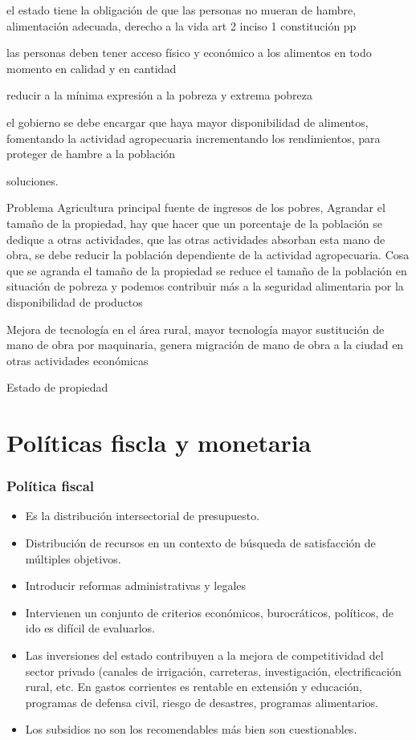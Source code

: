 \documentclass[
  letterpaper,
  DIV=11,
  numbers=noendperiod]{scrartcl}
\providecommand{\tightlist}{%
  \setlength{\itemsep}{0pt}\setlength{\parskip}{0pt}}\usepackage{longtable,booktabs,array}
\begin{document}
el estado tiene la obligación de que las personas no mueran de hambre,
alimentación adecuada, derecho a la vida art 2 inciso 1 constitución pp

las personas deben tener acceso físico y económico a los alimentos en
todo momento en calidad y en cantidad

reducir a la mínima expresión a la pobreza y extrema pobreza

el gobierno se debe encargar que haya mayor disponibilidad de alimentos,
fomentando la actividad agropecuaria incrementando los rendimientos,
para proteger de hambre a la población

soluciones.

Problema Agricultura principal fuente de ingresos de los pobres,
Agrandar el tamaño de la propiedad, hay que hacer que un porcentaje de
la población se dedique a otras actividades, que las otras actividades
absorban esta mano de obra, se debe reducir la población dependiente de
la actividad agropecuaria. Cosa que se agranda el tamaño de la propiedad
se reduce el tamaño de la población en situación de pobreza y podemos
contribuir más a la seguridad alimentaria por la disponibilidad de
productos

Mejora de tecnología en el área rural, mayor tecnología mayor
sustitución de mano de obra por maquinaria, genera migración de mano de
obra a la ciudad en otras actividades económicas

Estado de propiedad

\hypertarget{poluxedticas-fiscla-y-monetaria}{%
\section{Políticas fiscla y
monetaria}\label{poluxedticas-fiscla-y-monetaria}}

\hypertarget{poluxedtica-fiscal}{%
\subsubsection{Política fiscal}\label{poluxedtica-fiscal}}

\begin{itemize}
\tightlist
\item
  Es la distribución intersectorial de presupuesto.
\item
  Distribución de recursos en un contexto de búsqueda de satisfacción de
  múltiples objetivos.
\item
  Introducir reformas administrativas y legales
\item
  Intervienen un conjunto de criterios económicos, burocráticos,
  políticos, de ido es difícil de evaluarlos.
\item
  Las inversiones del estado contribuyen a la mejora de competitividad
  del sector privado (canales de irrigación, carreteras, investigación,
  electrificación rural, etc. En gastos corrientes es rentable en
  extensión y educación, programas de defensa civil, riesgo de
  desastres, programas alimentarios.
\item
  Los subsidios no son los recomendables más bien son cuestionables.
\end{itemize}
\end{document}
